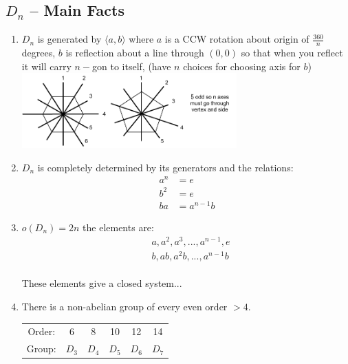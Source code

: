 \subsection*{$D_n$ -- Main Facts}
\begin{enumerate}
    \item $D_n$ is generated by $\langle a,b \rangle$ where $a$ is a CCW rotation about origin of $\frac{360}{n}$ degrees, $b$ is reflection about a line through $(0,0)$ so that when you reflect it will carry $n-$gon to itself, (have $n$ choices for choosing axis for $b$)\\
    \includegraphics[width=0.65\textwidth]{Figures/AxisChoiceforB-Dihedral.pdf}
    \item $D_n$ is completely determined by its generators and the relations:
    \begin{align}
        a^n&=e\nonumber \\
        b^2&=e \nonumber \\
        ba&=a^{n-1}b \nonumber
    \end{align}
    \item $o(D_n)=2n$ the elements are:
    \begin{align}
        &a,a^2,a^3, ... , a^{n-1},e \nonumber \\
        &b,ab,a^2b, ... , a^{n-1}b \nonumber
    \end{align}\\
    These elements give a closed system...
    \item There is a non-abelian group of every even order $> 4$.
 
    \begin{tabular}{|c|c|c|c|c|c|} \hline
            Order: & 6&8&10&12&14   \\
             Group: &$D_3$ &$D_4$&$D_5$&$D_6$&$D_7$ \\ \hline 
    \end{tabular}
    

\end{enumerate}
